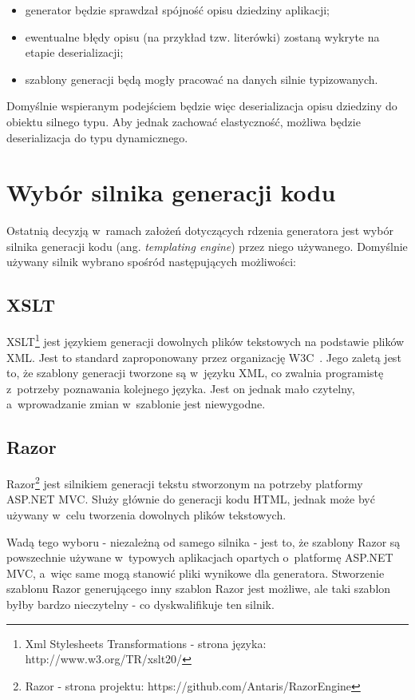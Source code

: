\begin{itemize}
 \item generator będzie sprawdzał spójność opisu dziedziny aplikacji;
 \item ewentualne błędy opisu (na przykład tzw. literówki) zostaną wykryte na etapie deserializacji;
 \item szablony generacji będą mogły pracować na danych silnie typizowanych.
\end{itemize}

Domyślnie wspieranym podejściem będzie więc deserializacja opisu dziedziny do obiektu silnego typu.
Aby jednak zachować elastyczność, możliwa będzie deserializacja do typu dynamicznego.



\section{Wybór silnika generacji kodu} \label{sec:core:templating_engine}

Ostatnią decyzją w~ramach założeń dotyczących rdzenia generatora jest wybór silnika generacji kodu (ang. \emph{templating engine}) przez niego używanego.
Domyślnie używany silnik wybrano spośród następujących możliwości:


\subsection{XSLT} \label{sec:xslt}

XSLT\footnote{Xml Stylesheets Transformations - strona języka: http://www.w3.org/TR/xslt20/} jest językiem generacji dowolnych plików tekstowych na podstawie plików XML.
Jest to standard zaproponowany przez organizację W3C~\cite{w3c}.
Jego zaletą jest to, że szablony generacji tworzone są w~języku XML, co zwalnia programistę z~potrzeby poznawania kolejnego języka.
Jest on jednak mało czytelny, a~wprowadzanie zmian w~szablonie jest niewygodne.


\subsection{Razor}

Razor\footnote{Razor - strona projektu: https://github.com/Antaris/RazorEngine} jest silnikiem generacji tekstu stworzonym na potrzeby platformy ASP.NET MVC.
Służy głównie do generacji kodu HTML, jednak może być używany w~celu tworzenia dowolnych plików tekstowych.

Wadą tego wyboru - niezależną od samego silnika - jest to, że szablony Razor są powszechnie używane w~typowych aplikacjach opartych o~platformę ASP.NET MVC, a~więc same mogą stanowić pliki wynikowe dla generatora.
Stworzenie szablonu Razor generującego inny szablon Razor jest możliwe, ale taki szablon byłby bardzo nieczytelny - co dyskwalifikuje ten silnik.


